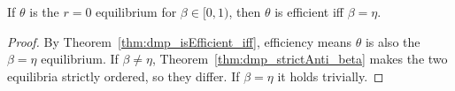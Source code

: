 \begin{theorem}
\label{thm:hosios}
\leanok
{}
If $\theta$ is the $r = 0$ equilibrium for $\beta \in [0, 1)$, then $\theta$ is efficient iff $\beta = \eta$.
\end{theorem}
\begin{proof}
\leanok
By Theorem~\ref{thm:dmp_isEfficient_iff}, efficiency means $\theta$ is also the $\beta = \eta$ equilibrium. If
$\beta \neq \eta$, Theorem~\ref{thm:dmp_strictAnti_beta} makes the two equilibria strictly ordered, so they differ.
If $\beta = \eta$ it holds trivially.
\end{proof}

